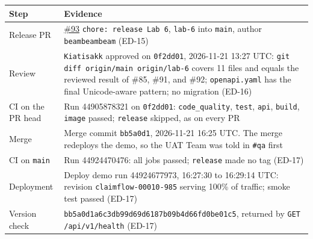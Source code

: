 
\begin{longtable}{@{}R{3cm}R{13cm}@{}}
\toprule \textbf{Step} & \textbf{Evidence} \\ \midrule \endhead
Release PR & \href{https://github.com/beambeambeam/claimflow/pull/93}{\#93} \texttt{chore: release Lab 6}, \texttt{lab-6} into \texttt{main}, author \texttt{beambeambeam} (ED-15) \\
Review & \texttt{Kiatisakk} approved on \texttt{0f2dd01}, 2026-11-21 13:27 UTC: \texttt{git diff origin/main origin/lab-6} covers 11 files and equals the reviewed result of \#85, \#91, and \#92; \texttt{openapi.yaml} has the final Unicode-aware pattern; no migration (ED-16) \\
CI on the PR head & Run 44905878321 on \texttt{0f2dd01}: \texttt{code\_quality}, \texttt{test}, \texttt{api}, \texttt{build}, \texttt{image} passed; \texttt{release} skipped, as on every PR \\
Merge & Merge commit \texttt{bb5a0d1}, 2026-11-21 16:25 UTC. The merge redeploys the demo, so the UAT Team was told in \texttt{\#qa} first \\
CI on \texttt{main} & Run 44924470476: all jobs passed; \texttt{release} made no tag (ED-17) \\
Deployment & Deploy demo run 44924677973, 16:27:30 to 16:29:14 UTC: revision \texttt{claimflow-00010-985} serving 100\% of traffic; smoke test passed (ED-17) \\
Version check & \texttt{bb5a0d1a6c3db99d69d6187b09b4d66fd0be01c5}, returned by \texttt{GET /api/v1/health} (ED-17) \\
\bottomrule
\end{longtable}



